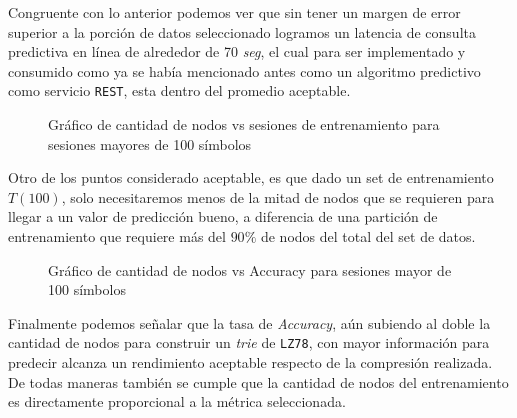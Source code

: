 	Congruente con lo anterior podemos ver que sin tener un margen de error superior a la porción de datos seleccionado logramos un latencia de consulta predictiva en línea de alrededor de 70 \emph{seg}, el cual para ser implementado y consumido como ya se había mencionado antes como un algoritmo predictivo como servicio \texttt{REST}, esta dentro del promedio aceptable.

	\begin{figure}[h] 
		\centering
		\caption{Gráfico de cantidad de nodos vs sesiones de entrenamiento para sesiones mayores de 100 símbolos}
	  \label{fig:sim}
	\end{figure}


	Otro de los puntos  considerado aceptable, es que dado un set de entrenamiento $T(100)$, solo necesitaremos menos de la mitad de nodos que se requieren para llegar a un valor de predicción bueno, a diferencia de una partición de entrenamiento que requiere más del $90\%$ de nodos del total del set de datos.\\
	

	
	\begin{figure}[h] 
		\centering
			\caption{Gráfico de cantidad de nodos vs Accuracy para sesiones mayor de 100 símbolos}
		\label{fig:sim}
	\end{figure}



	Finalmente podemos señalar que la tasa de \emph{Accuracy}, aún  subiendo al doble la cantidad de nodos para construir un \emph{trie} de \texttt{LZ78}, con mayor información  para predecir alcanza un rendimiento aceptable respecto de la compresión realizada. De todas maneras también se cumple que la cantidad de nodos del entrenamiento es directamente proporcional a la métrica seleccionada.
